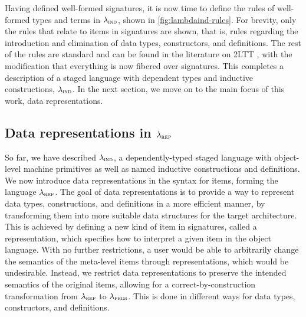 Having defined well-formed signatures, it is now time to define the rules of
well-formed types and terms in $\lambda_{\textsc{ind}}$, shown in
\cref{fig:lambdaind-rules}. For brevity, only the rules that relate to items in
signatures are shown, that is, rules regarding the introduction and elimination
of data types, constructors, and definitions. The rest of the rules are
standard and can be found in the literature on 2LTT \cite{Kovacs2022-vb}, with
the modification that everything is now fibered over signatures. This completes
a description of a staged language with dependent types and inductive
constructions, $\lambda_{\textsc{ind}}$. In the next section, we move on to the main focus
of this work, data representations.

\subsection{Data representations in $\lambda_{\textsc{rep}}$}\label{sub:lambdarep}

So far, we have described $\lambda_{\textsc{ind}}$, a dependently-typed staged language
with object-level machine primitives as well as named inductive constructions
and definitions. We now introduce data representations in the syntax for items,
forming the language $\lambda_{\textsc{rep}}$. The goal of data representations is to
provide a way to represent data types, constructions, and definitions in a more
efficient manner, by transforming them into more suitable data structures for
the target architecture. This is achieved by defining a new kind of item in
signatures, called a representation, which specifies how to interpret a given
item in the object language. With no further restrictions, a user would be able
to arbitrarily change the semantics of the meta-level items through
representations, which would be undesirable. Instead, we restrict data
representations to preserve the intended semantics of the original items,
allowing for a correct-by-construction transformation from $\lambda_{\textsc{rep}}$ to
$\lambda_{\textsc{prim}}$. This is done in different ways for data types, constructors, and
definitions.

